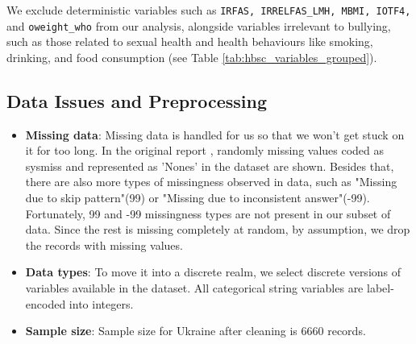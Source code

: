 \documentclass[main.tex]{subfiles}
\begin{document}
We exclude deterministic variables such as \texttt{IRFAS, IRRELFAS\_LMH, MBMI, IOTF4,} and \texttt{oweight\_who} from our analysis, alongside variables irrelevant to bullying, such as those related to sexual health and health behaviours like smoking, drinking, and food consumption (see Table \ref{tab:hbsc_variables_grouped}).


% 

% 



% 

\subsection{Data Issues and Preprocessing}
\begin{itemize}
  \item \textbf{Missing data}: 
  Missing data is handled for us so that we won't get stuck on it for too long. In the original report \cite{HBSC2018OA_ed1}, randomly missing values coded as sysmiss and represented as 'Nones' in the dataset are shown. Besides that, there are also more types of missingness observed in data, such as "Missing due to skip pattern"(99) or "Missing due to inconsistent answer"(-99). Fortunately, 99 and -99 missingness types are not present in our subset of data. Since the rest is missing completely at random, by assumption, we drop the records with missing values.
  \item \textbf{Data types}: To move it into a discrete realm, we select discrete versions of variables available in the dataset. All categorical string variables are label-encoded into integers. 
  \item \textbf{Sample size}: Sample size for Ukraine after cleaning is 6660 records. 
\end{itemize}


\end{document}

